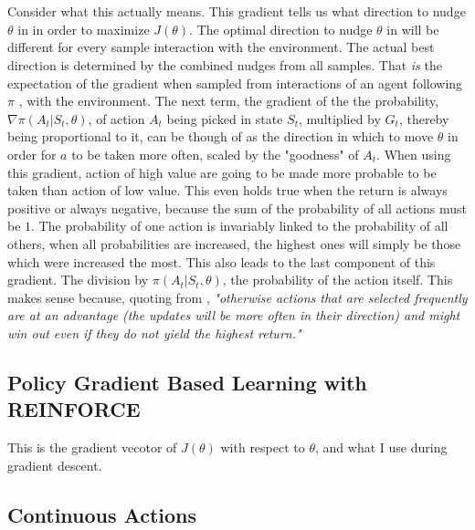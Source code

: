\noindent
\\ \\ Consider what this actually means. This gradient tells us what direction to nudge $\theta$ in in order to maximize $J(\theta)$. The optimal direction to nudge $\theta$ in will be different for every sample interaction with the environment. The actual best direction is determined by the combined nudges from all samples. That \textit{is} the expectation of the gradient when sampled from interactions of an agent following $\pi$ , with the environment.
\nolinebreak
The next term, the gradient of the the probability, $\nabla \pi(A_t|S_t, \theta)$, of action $A_t$ being picked in state $S_t$, multiplied by $G_t$, thereby being proportional to it, can be though of as the direction in which to move $\theta$ in order for $a$ to be taken more often, scaled by the "goodness" of $A_t$. When using this gradient, action of high value are going to be made more probable to be taken than action of low value. This even holds true when the return is always positive or always negative, because the sum of the probability of all actions must be $1$. The probability of one action is invariably linked to the probability of all others, when all probabilities are increased, the highest ones will simply be those which were increased the most. This also leads to the last component of this gradient. The division by $\pi(A_t|S_t, \theta)$, the probability of the action itself. This makes sense because, quoting from , \textit{"otherwise actions that are selected frequently are at an advantage (the updates will be more often in their direction) and might win out even if they do not yield the highest return." }

\subsection{Policy Gradient Based Learning with REINFORCE}\label{subsec:pg:reinforce}
This is the gradient vecotor of $J(\theta)$ with respect to $\theta$, and what I use during gradient descent. 

\subsection{Continuous Actions}\label{subsec:pg:continuous}

